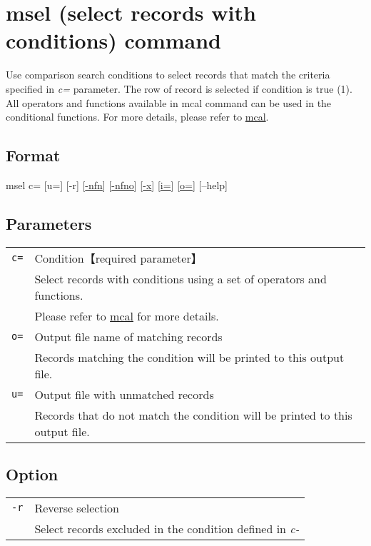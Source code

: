 \documentclass[a4paper]{jarticle}
\begin{document}
\setlength{\baselineskip}{4mm}

\section*{msel (select records with conditions) command}

Use comparison search conditions to select records that match the criteria specified in \emph{c=} parameter. The row of record is selected if condition is true (1). 
All operators and functions available in mcal command can be used in the conditional functions. For more details, please refer to \href{run:mcal.pdf}{mcal}.

\subsection*{Format}
msel c=  [u=] [-r]  [\href{run:option.pdf}{-nfn}] [\href{run:option.pdf}{-nfno}]  [\href{run:option.pdf}{-x}]  [\href{run:option.pdf}{i=}] [\href{run:option.pdf}{o=}] [--help]\\


\subsection*{Parameters}
\begin{table}[htbp]
{\small
\begin{tabular}{ll}
\verb|c=|    & Condition【required parameter】\\
& Select records with conditions using a set of operators and functions. \\
& Please refer to \href{run:mcal.pdf}{mcal} for more details. \\

\verb|o=|    & Output file name of matching records  \\
& Records matching the condition will be printed to this output file. \\
\verb|u=|    & Output file with unmatched records \\
& Records that do not match the condition will be printed to this output file. \\
\end{tabular} 
}
\end{table} 

\subsection*{Option}
\begin{table}[htbp]
{\small
\begin{tabular}{ll}
\verb|-r|    & Reverse selection\\
& Select records excluded in the condition defined in \emph{c-}\\
\end{tabular} 
}
\end{table} 
\end{document}
